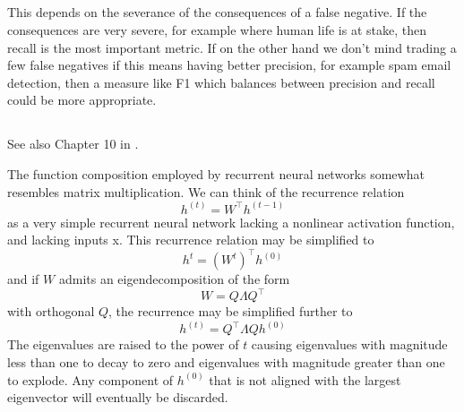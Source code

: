 \documentclass{article}
\begin{document}
\subsection{}

This depends on the severance of the consequences of a false negative. If the consequences are very severe, for example where human life is at stake, then recall is the most important metric. If on the other hand we don’t mind trading a few false negatives if this means having better precision, for example spam email detection, then a measure like F1 which balances between precision and recall could be more appropriate.

\subsection{}

See also Chapter 10 in \cite{Goodfellow-et-al-2016}.

The function composition employed by recurrent neural networks somewhat resembles matrix multiplication. We can think of the recurrence relation
\[h^{(t)} = W^\top h^{(t-1)}\]
as a very simple recurrent neural network lacking a nonlinear activation function, and lacking inputs x. This recurrence relation may be simplified to
\[h^{t} = \left( W^t \right)^\top h^{(0)}\]
and if \(W\) admits an eigendecomposition of the form
\[W = Q \Lambda Q^\top\]
with orthogonal \(Q\), the recurrence may be simplified further to
\[h^{(t)} = Q^\top \Lambda Q h^{(0)}\]
The eigenvalues are raised to the power of \(t\) causing eigenvalues with magnitude less than one to decay to zero and eigenvalues with magnitude greater than one to explode. Any component of \(h^{(0)}\) that is not aligned with the largest eigenvector will eventually be discarded.

\end{document}
